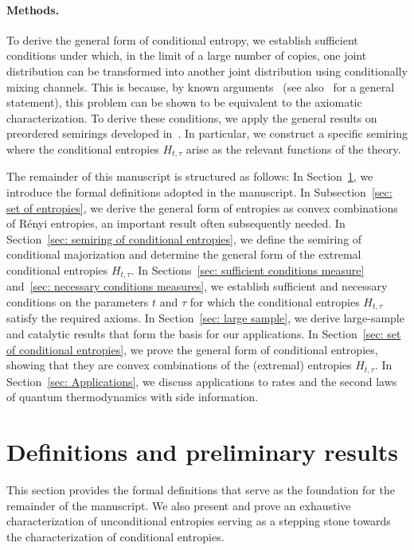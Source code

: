 \documentclass[aps,pra,11pt,onecolumn,nofootinbib,tightenlines]{revtex4-2}
\theoremstyle{definition}
\begin{document}
\paragraph*{Methods.} 
To derive the general form of conditional entropy, we establish sufficient conditions under which, in the limit of a large number of copies, one joint distribution can be transformed into another joint distribution using conditionally mixing channels. This is because, by known arguments~\cite{mu21_renyi} (see also~\cite{haapasalo_inprep} for a general statement), this problem can be shown to be equivalent to the axiomatic characterization.
To derive these conditions, we apply the general results on preordered semirings developed in~\cite{fritz2023abstract,fritz2023abstractII}. 
In particular, we construct a specific semiring where the conditional entropies \( H_{t,\tau} \) arise as the relevant functions of the theory.   

\bigskip

The remainder of this manuscript is structured as follows: In Section~\ref{sec: formal definitions}, we introduce the formal definitions adopted in the manuscript. In Subsection~\ref{sec: set of entropies}, we derive the general form of entropies as convex combinations of R\'enyi entropies, an important result often subsequently needed. In Section~\ref{sec: semiring of conditional entropies}, we define the semiring of conditional majorization and determine the general form of the extremal conditional entropies $H_{t,\tau}$. In Sections~\ref{sec: sufficient conditions measure} and~\ref{sec: necessary conditions measures}, we establish sufficient and necessary conditions on the parameters $t$ and $\tau$ for which the conditional entropies $H_{t,\tau}$ satisfy the required axioms. In Section~\ref{sec: large sample}, we derive large-sample and catalytic results that form the basis for our applications. In Section~\ref{sec: set of conditional entropies}, we prove the general form of conditional entropies, showing that they are convex combinations of the (extremal) entropies $H_{t,\tau}$. In Section~\ref{sec: Applications}, we discuss applications to rates and the second laws of quantum thermodynamics with side information.

\section{Definitions and preliminary results}
\label{sec: formal definitions}
This section provides the formal definitions that serve as the foundation for the remainder of the manuscript. We also present and prove an exhaustive characterization of unconditional entropies serving as a stepping stone towards the characterization of conditional entropies.
\end{document}
